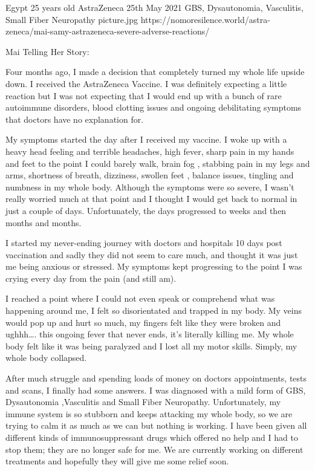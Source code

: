 {Egypt}
{25 years old}
{AstraZeneca}
{25th May 2021}
{GBS, Dysautonomia, Vasculitis, Small Fiber Neuropathy}
{picture.jpg}
{https://nomoresilence.world/astra-zeneca/mai-samy-astrazeneca-severe-adverse-reactions/}
{

Mai Telling Her Story:

Four months ago, I made a decision that completely turned my whole life upside
down. I received the AstraZeneca Vaccine. I was definitely expecting a little
reaction but I was not expecting that I would end up with a bunch of rare
autoimmune disorders, blood clotting issues and ongoing debilitating symptoms
that doctors have no explanation for.

My symptoms started the day after I received my vaccine. I woke up with a heavy
head feeling and terrible headaches, high fever, sharp pain in my hands and feet
to the point I could barely walk, brain fog , stabbing pain in my legs and arms,
shortness of breath, dizziness, swollen feet , balance issues, tingling and
numbness in my whole body. Although the symptoms were so severe, I wasn’t really
worried much at that point and I thought I would get back to normal in just a
couple of days. Unfortunately, the days progressed to weeks and then months and
months.

I started my never-ending journey with doctors and hospitals 10 days post vaccination and sadly they did not seem to care much, and thought it was just me being anxious or stressed. My symptoms kept progressing to the point I was crying every day from the pain (and still am).

I reached a point where I could not even speak or comprehend what was happening
around me, I felt so disorientated and trapped in my body. My veins would pop up
and hurt so much, my fingers felt like they were broken and ughhh…. this ongoing
fever that never ends, it’s literally killing me. My whole body felt like it was
being paralyzed and I lost all my motor skills. Simply, my whole body collapsed.

After much struggle and spending loads of money on doctors appointments, tests
and scans, I finally had some answers. I was diagnosed with a mild form of GBS,
Dysautonomia ,Vasculitis and Small Fiber Neuropathy. Unfortunately, my immune
system is so stubborn and keeps attacking my whole body, so we are trying to
calm it as much as we can but nothing is working. I have been given all
different kinds of immunosuppressant drugs which offered no help and I had to
stop them; they are no longer safe for me. We are currently working on different
treatments and hopefully they will give me some relief soon.

}
